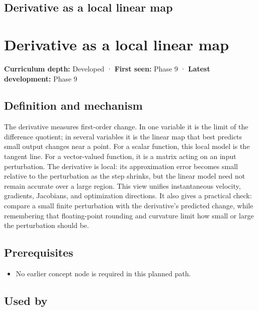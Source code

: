 \hypertarget{appendix-7bc181935c42}{}
\section*{Derivative as a local linear map}
\chapter{Derivative as a local linear map}\label{appendix-7bc181935c42-derivative-as-a-local-linear-map}

\textbf{Curriculum depth:} Developed · \textbf{First seen:} Phase 9 · \textbf{Latest development:} Phase 9

\section{Definition and mechanism}\label{appendix-7bc181935c42-definition-and-mechanism}

The derivative measures first-order change. In one variable it is the limit of the difference quotient; in several variables it is the linear map that best predicts small output changes near a point. For a scalar function, this local model is the tangent line. For a vector-valued function, it is a matrix acting on an input perturbation. The derivative is local: its approximation error becomes small relative to the perturbation as the step shrinks, but the linear model need not remain accurate over a large region. This view unifies instantaneous velocity, gradients, Jacobians, and optimization directions. It also gives a practical check: compare a small finite perturbation with the derivative's predicted change, while remembering that floating-point rounding and curvature limit how small or large the perturbation should be.

\section{Prerequisites}\label{appendix-7bc181935c42-prerequisites}

\begin{itemize}
\tightlist
\item
  No earlier concept node is required in this planned path.
\end{itemize}

\section{Used by}\label{appendix-7bc181935c42-used-by}


